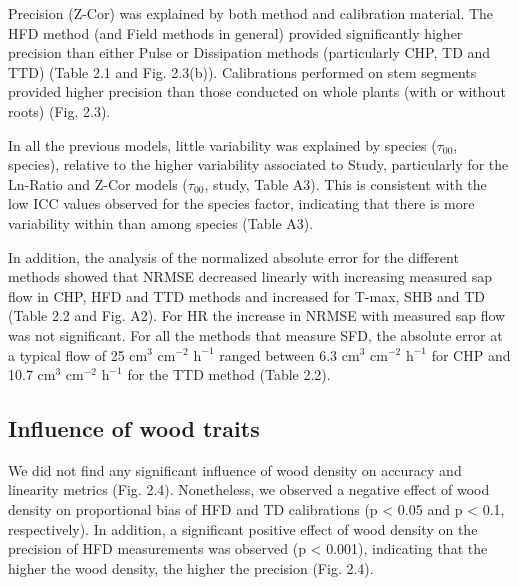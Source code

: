 \documentclass[11pt,twoside]{reedthesis}
\begin{document}
Precision (Z-Cor) was explained by both method and calibration material.
The HFD method (and Field methods in general) provided significantly
higher precision than either Pulse or Dissipation methods (particularly
CHP, TD and TTD) (Table 2.1 and Fig. 2.3(b)). Calibrations performed on
stem segments provided higher precision than those conducted on whole
plants (with or without roots) (Fig. 2.3).\par

In all the previous models, little variability was explained by species
(\(\tau_{00}\), species), relative to the higher variability associated
to Study, particularly for the Ln-Ratio and Z-Cor models (\(\tau_{00}\),
study, Table A3). This is consistent with the low ICC values observed
for the species factor, indicating that there is more variability within
than among species (Table A3).\par

In addition, the analysis of the normalized absolute error for the
different methods showed that NRMSE decreased linearly with increasing
measured sap flow in CHP, HFD and TTD methods and increased for T-max,
SHB and TD (Table 2.2 and Fig. A2). For HR the increase in NRMSE with
measured sap flow was not significant. For all the methods that measure
SFD, the absolute error at a typical flow of 25 \(\text{cm}^3\)
\(\text{cm}^{-2}\) \(\text{h}^{-1}\) ranged between 6.3 \(\text{cm}^3\)
\(\text{cm}^{-2}\) \(\text{h}^{-1}\) for CHP and 10.7 \(\text{cm}^3\)
\(\text{cm}^{-2}\) \(\text{h}^{-1}\) for the TTD method (Table 2.2).\par

\subsection{Influence of wood traits}\label{influence-of-wood-traits}

We did not find any significant influence of wood density on accuracy
and linearity metrics (Fig. 2.4). Nonetheless, we observed a negative
effect of wood density on proportional bias of HFD and TD calibrations
(p \textless{} 0.05 and p \textless{} 0.1, respectively). In addition, a
significant positive effect of wood density on the precision of HFD
measurements was observed (p \textless{} 0.001), indicating that the
higher the wood density, the higher the precision (Fig. 2.4).\par
\end{document}
